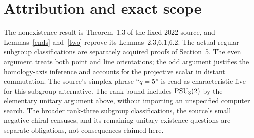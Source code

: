\documentclass[11pt]{article}
\begin{document}
\section*{Attribution and exact scope}
The nonexistence result is Theorem~1.3 of the fixed 2022 source, and
Lemmas~\ref{ends} and~\ref{two} reprove its Lemmas~2.3,6.1,6.2.
The actual regular subgroup classifications are separately acquired
proofs of Section~5. The even argument treats both point and line orientations; the odd
argument justifies the homology-axis inference and accounts for the
projective scalar in distant commutation. The source's simplex
phrase ``$q=5$'' is read as characteristic five for this subgroup
alternative. The rank bound includes $\operatorname{PSU}_3(2)$ by the elementary
unitary argument above, without importing an unspecified computer
search. The broader rank-three subgroup classifications, the source's
small negative chiral censuses, and its remaining unitary existence
questions are separate obligations, not consequences claimed here.
\end{document}
